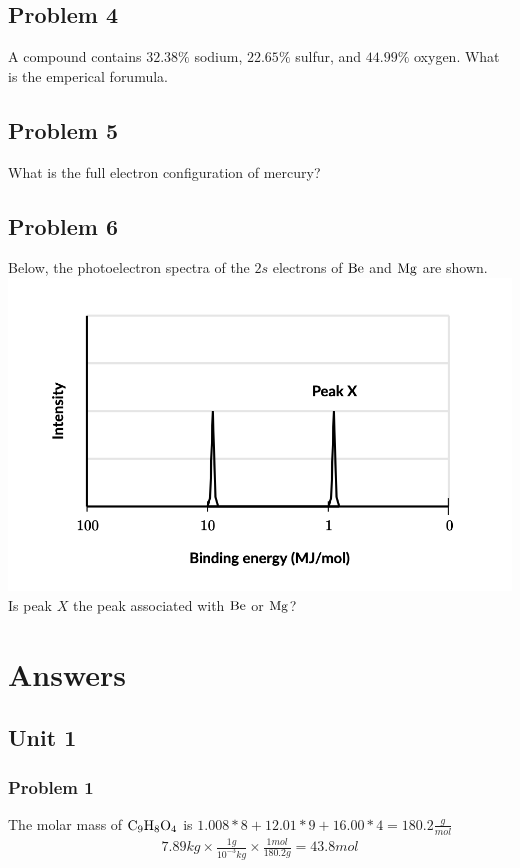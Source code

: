 \documentclass{article}
\begin{document}
\subsection*{Problem 4}
A compound contains \(32.38\%\) sodium, \(22.65\%\) sulfur, and \(44.99\%\) oxygen. What is the emperical forumula. 
\subsection*{Problem 5}
What is the full electron configuration of mercury?
\subsection*{Problem 6}
Below, the photoelectron spectra of the \(2s\) electrons of \(\ce{Be}\) and \(\ce{Mg}\) are shown.
\includegraphics[scale = 0.5]{photos/photo2.png} \\
Is peak \(X\) the peak associated with \(\ce{Be}\) or \(\ce{Mg}\)?



\newpage
\section{Answers}
\subsection{Unit 1}
\subsubsection*{Problem 1}
The molar mass of \(\ce{C_9H_8O_4}\) is \(1.008*8 + 12.01*9 + 16.00*4 = 180.2 \frac{g}{mol}\)
\begin{equation}
\begin{aligned}
    7.89kg \times \frac{1g}{10^{-3}kg} \times \frac{1mol}{180.2g} = 43.8mol
\end{aligned}
\end{equation}
\end{document}
